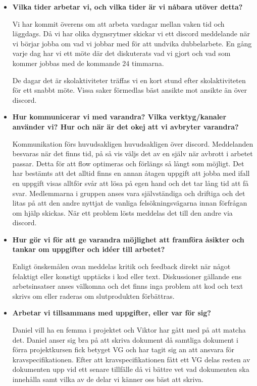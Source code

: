 \documentclass{mall}
\begin{document}
\begin{itemize}
\item \textbf{Vilka tider arbetar vi, och vilka tider är vi nåbara utöver detta?}

  Vi har kommit överens om att arbeta vardagar mellan vaken tid och läggdags. Då vi har olika dygnsrytmer skickar vi ett discord meddelande när vi börjar jobba om vad vi jobbar med för att undvika dubbelarbete. En gång varje dag har vi ett möte där det diskuterats vad vi gjort och vad som kommer jobbas med de kommande 24 timmarna.

  De dagar det är skolaktiviteter träffas vi en kort stund efter skolaktiviteten för ett snabbt möte. Vissa saker förmedlas bäst ansikte mot ansikte än över discord.

\item \textbf{Hur kommunicerar vi med varandra? Vilka verktyg/kanaler använder vi? Hur och när är det okej att vi avbryter varandra?}

  Kommunikation förs huvudsakligen huvudsakligen över discord. Meddelanden besvaras när det finns tid, på så vis väljs det av en själv när avbrott i arbetet passar. Detta för att flow optimeras och förlängs så långt som möjligt. Det har bestämts att det alltid finns en annan åtagen uppgift att jobba med ifall en uppgift visas alltför svår att lösa på egen hand och det tar lång tid att få svar.  Medlemmarna i gruppen anses vara självständiga och driftiga och det litas på att den andre nyttjat de vanliga felsökningsvägarna innan förfrågan om hjälp skickas. När ett problem lösts meddelas det till den andre via discord.


  \item \textbf{Hur gör vi för att ge varandra möjlighet att framföra åsikter och tankar om uppgifter och idéer till arbetet?}

Enligt önskemålen ovan meddelas kritik och feedback direkt när något felaktigt eller konstigt upptäcks i kod eller text. Diskussioner gällande ens arbetsinsatser anses välkomna och det finns inga problem att kod och text skrivs om eller raderas om slutprodukten förbättras.

\item \textbf{Arbetar vi tillsammans med uppgifter, eller var för sig?}

  Daniel vill ha en femma i projektet och Viktor har gått med på att matcha det. Daniel anser sig bra på att skriva dokument då samtliga dokument i förra projektkursen fick betyget VG och har tagit sig an att ansvara för kravspecifikationen. Efter att kravspecifikationen fått ett VG delas resten av dokumenten upp vid ett senare tillfälle då vi bättre vet vad dokumenten ska innehålla samt vilka av de delar vi känner oss bäst att skriva.



\end{itemize}
\end{document}
